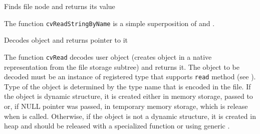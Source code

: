 \label{ReadStringByName}

Finds file node and returns its value


\begin{description}
\end{description}

The function \texttt{cvReadStringByName} is a simple superposition of  and .

\label{Read}

Decodes object and returns pointer to it


\begin{description}
\end{description}

The function \texttt{cvRead} decodes user object (creates object in a
native representation from the file storage subtree) and returns it. The
object to be decoded must be an instance of registered type that supports
\texttt{read} method (see ). Type of the object is
determined by the type name that is encoded in the file. If the object
is dynamic structure, it is created either in memory storage, passed to
 or, if NULL pointer was passed, in temporary
memory storage, which is release when  is
called. Otherwise, if the object is not a dynamic structure, it is
created in heap and should be released with a specialized function or
using generic .

